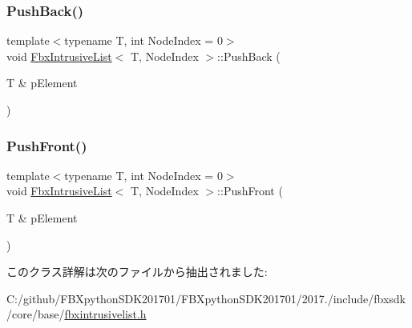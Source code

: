 \mbox{\label{class_fbx_intrusive_list_a44885493815547ff84cc6650a55defa7}} 
\subsubsection{\texorpdfstring{Push\+Back()}{PushBack()}}
{\footnotesize\ttfamily template$<$typename T, int Node\+Index = 0$>$ \\
void \hyperlink{class_fbx_intrusive_list}{Fbx\+Intrusive\+List}$<$ T, Node\+Index $>$\+::Push\+Back (\begin{DoxyParamCaption}\item[{T \&}]{p\+Element }\end{DoxyParamCaption})}

\mbox{\label{class_fbx_intrusive_list_a02701251943f1d1f72709954a5c76999}} 
\subsubsection{\texorpdfstring{Push\+Front()}{PushFront()}}
{\footnotesize\ttfamily template$<$typename T, int Node\+Index = 0$>$ \\
void \hyperlink{class_fbx_intrusive_list}{Fbx\+Intrusive\+List}$<$ T, Node\+Index $>$\+::Push\+Front (\begin{DoxyParamCaption}\item[{T \&}]{p\+Element }\end{DoxyParamCaption})}



このクラス詳解は次のファイルから抽出されました\+:\begin{DoxyCompactItemize}
\item 
C\+:/github/\+F\+B\+Xpython\+S\+D\+K201701/\+F\+B\+Xpython\+S\+D\+K201701/2017./include/fbxsdk/core/base/\hyperlink{fbxintrusivelist_8h}{fbxintrusivelist.\+h}\end{DoxyCompactItemize}
